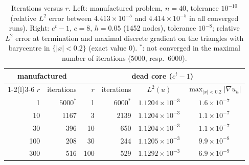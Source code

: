 \documentclass[11pt]{amsart}
\theoremstyle{definition}
\theoremstyle{remark}
\numberwithin{equation}{section}
\newcommand{\abs}[1]{\lvert #1\rvert}
\begin{document}
\begin{table}[t]
\caption{Iterations versus $r$. Left: manufactured problem, $n=40$, tolerance $10^{-10}$ (relative $L^2$ error between $4.413\times10^{-5}$ and $4.414\times10^{-5}$ in all converged runs). Right: $e^t-1$, $c=8$, $h=0.05$ (1452 nodes), tolerance $10^{-8}$; relative $L^2$ error at termination and maximal discrete gradient on the triangles with barycentre in $\{\abs x<0.2\}$ (exact value $0$). $^*$: not converged in the maximal number of iterations ($5000$, resp.\ $6000$).}\label{tab:r}
\small
\begin{tabular}{@{}rr@{\qquad}rrcc@{}}
\toprule
\multicolumn{2}{c}{manufactured} & \multicolumn{4}{c}{dead core ($e^t-1$)}\\
\cmidrule(r){1-2}\cmidrule(l){3-6}
$r$ & iterations & $r$ & iterations & $L^2(u)$ & $\max_{\abs x<0.2}\abs{\nabla u_h}$\\
\midrule
1 & $5000^*$ & 1 & $6000^*$ & $1.1204\times10^{-3}$ & $1.6\times10^{-7}$\\
10 & 1167 & 3 & 2139 & $1.1204\times10^{-3}$ & $1.1\times10^{-7}$\\
30 & 396 & 10 & 650 & $1.1204\times10^{-3}$ & $1.1\times10^{-7}$\\
100 & 208 & 30 & 244 & $1.1205\times10^{-3}$ & $9.9\times10^{-8}$\\
300 & 516 & 100 & 529 & $1.1292\times10^{-3}$ & $6.9\times10^{-9}$\\
\bottomrule
\end{tabular}
\end{table}
\end{document}
